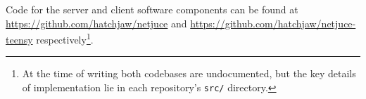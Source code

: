 Code for the server and client software components can be found at
\url{https://github.com/hatchjaw/netjuce} and
\url{https://github.com/hatchjaw/netjuce-teensy} respectively\footnote{
    At the time of writing both codebases are undocumented, but the key
    details of implementation lie in each repository's \texttt{src/}
    directory.
}.


